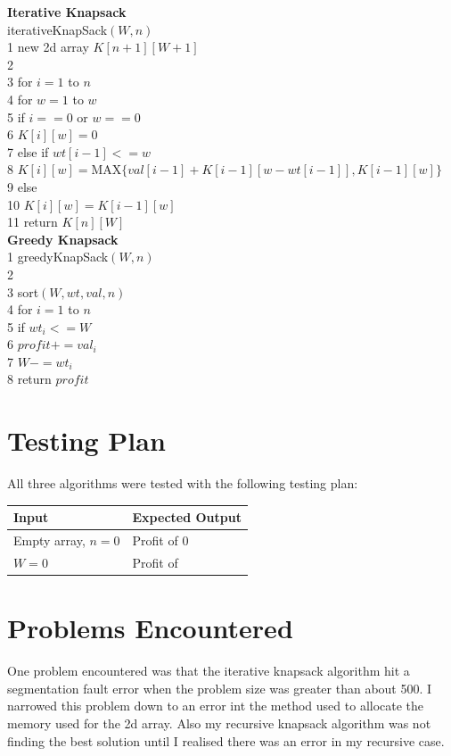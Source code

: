 \documentclass[a4paper]{article}
\begin{document}
    \textbf{Iterative Knapsack} \\
    iterativeKnapSack$(W, n)$ \\
    1 new 2d array $K[n+1][W+1]$ \\
    2 \\
    3 for $i = 1$ to $n$ \\
    4 \phantom{hell}for $w = 1$ to $w$ \\
    5 \phantom{hellhell}if $i == 0$ or $w == 0$ \\
    6 \phantom{hellhellhell}$K[i][w] = 0$ \\
    7 \phantom{hellhell}else if $wt[i-1] <= w$ \\
    8 \phantom{hellhellhell}$K[i][w] = $MAX$\{val[i-1] + K[i-1][w-wt[i-1]], K[i-1][w]\}$ \\
    9 \phantom{hellhell}else \\
    10 \phantom{hellhellhel}$K[i][w] = K[i-1][w]$ \\
    11 return $K[n][W]$ \\
    
    \newpage
    \textbf{Greedy Knapsack} \\
    1 greedyKnapSack$(W, n)$ \\
    2 \\
    3 sort$(W, wt, val, n)$ \\
    4 for $i = 1$ to $n$ \\
    5 \phantom{hell}if $wt_{i} <= W$ \\
    6 \phantom{hellhell}$profit += val_{i}$ \\
    7 \phantom{hellhell}$W -= wt_{i}$ \\
    8 return $profit$


    \section{Testing Plan}
    All three algorithms were tested with the following testing plan: \\

    \begin{tabular}{ |l|l|}
        \hline
        \textbf{Input} & \textbf{Expected Output}\\ \hline
        Empty array, $n=0$ & Profit of 0 \\ \hline
        $W=0$ & Profit of \\ \hline
    \end{tabular}

    
    \section{Problems Encountered}
    One problem encountered was that the iterative knapsack algorithm hit a segmentation fault
    error when the problem size was greater than about 500. I narrowed this problem down to 
    an error int the method used to allocate the memory used for the 2d array. Also my 
    recursive knapsack algorithm was not finding the best solution until I realised there was
    an error in my recursive case. 
\end{document}
